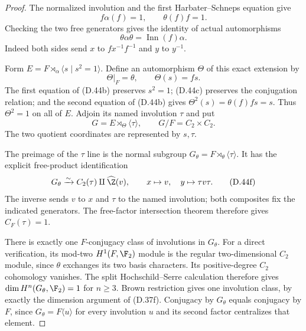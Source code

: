 \begin{proof}
The normalized involution and the first
Harbater--Schneps equation give
\[
                  f\alpha(f)=1,\qquad\theta(f)f=1.
                                                        \tag{D.44b}
\]
Checking the two free generators gives the
identity of actual automorphisms
\[
                 \theta\alpha\theta
                        =\operatorname{Inn}(f)\alpha.
                                                        \tag{D.44c}
\]
Indeed both sides send $x$ to $fx^{-1}f^{-1}$
and $y$ to $y^{-1}$.

Form $E=F\rtimes_\alpha\langle s\mid s^2=1\rangle$.
Define an automorphism $\Theta$ of this exact
extension by
\[
                      \Theta|_F=\theta,\qquad
                      \Theta(s)=fs.                    \tag{D.44d}
\]
The first equation of (D.44b) preserves $s^2=1$;
(D.44c) preserves the conjugation relation;
and the second equation of (D.44b) gives
$\Theta^2(s)=\theta(f)fs=s$.
Thus $\Theta^2=1$ on all of $E$.
Adjoin its named involution $\tau$ and put
\[
 G=E\rtimes_\Theta\langle\tau\rangle,\qquad
                         G/F=C_2\times C_2.
                                                        \tag{D.44e}
\]
The two quotient coordinates are represented
by $s,\tau$.

The preimage of the $\tau$ line is the normal
subgroup
$G_\theta=F\rtimes_\theta\langle\tau\rangle$.
It has the explicit free-product identification
\[
 G_\theta\xrightarrow{\sim}
                  C_2(\tau)\amalg\widehat\Z(v),
       \qquad x\mapsto v,\quad y\mapsto\tau v\tau.
                                                        \tag{D.44f}
\]
The inverse sends $v$ to $x$ and $\tau$ to
the named involution; both composites fix
the indicated generators.
The free-factor intersection theorem
\cite[Theorem 5 of the inspected author version]{A-HerfortZalesskii2008}
therefore gives $C_F(\tau)=1$.

There is exactly one $F$-conjugacy class of
involutions in $G_\theta$.
For a direct verification, its mod-two
$H^1(F,\F_2)$ module is the regular
two-dimensional $C_2$ module, since $\theta$
exchanges its two basis characters.
Its positive-degree $C_2$ cohomology vanishes.
The split Hochschild--Serre calculation
therefore gives
$\dim H^n(G_\theta,\F_2)=1$ for $n\geq3$.
Brown restriction
\cite[Theorem 2 and \S1.1]{A-KochloukovaZalesskii2007}
gives one involution class, by exactly the
dimension argument of (D.37f).
Conjugacy by $G_\theta$ equals conjugacy by
$F$, since $G_\theta=F\langle u\rangle$
for every involution $u$ and its second
factor centralizes that element.


\end{proof}
